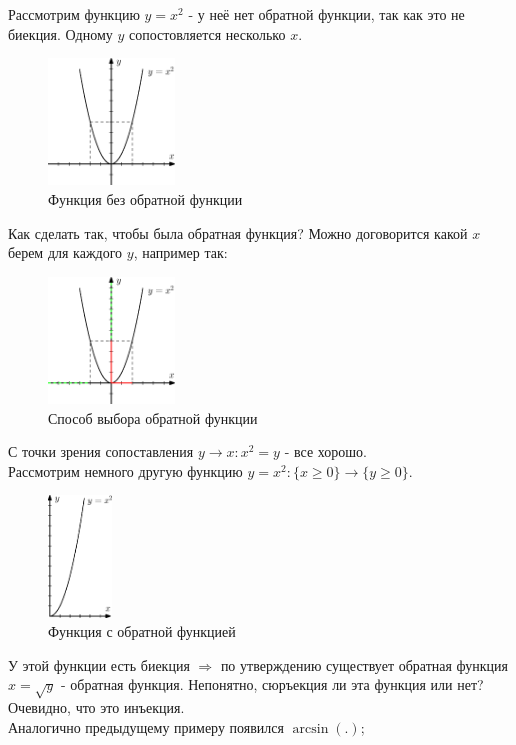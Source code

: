 \documentclass[12pt]{article}
\theoremstyle{definition}
\begin{document}
Рассмотрим функцию $y = x^2$ - у неё нет обратной функции, так как это не биекция. Одному $y$ сопостовляется несколько $x$.
\begin{figure}[H]
	\centering
	\includegraphics[width=0.3\textwidth]{4_5.eps}
	\caption{Функция без обратной функции}
	\label{4_5}
\end{figure}
Как сделать так, чтобы была обратная функция? Можно договорится какой $x$ берем для каждого $y$, например так:
\begin{figure}[H]
	\centering
	\includegraphics[width=0.3\textwidth]{4_6.eps}
	\caption{Способ выбора обратной функции}
	\label{4_6}
\end{figure}
С точки зрения сопоставления $y \rightarrow x \colon x^2 = y$ - все хорошо.\\
Рассмотрим немного другую функцию $y = x^2 \colon \{ x \geq 0 \} \rightarrow \{ y \geq 0 \}$.

\begin{figure}[H]
	\centering
	\includegraphics[width=0.15\textwidth]{4_7.eps}
	\caption{Функция с обратной функцией}
	\label{4_7}
\end{figure}
У этой функции есть биекция $\Rightarrow$ по утверждению существует обратная функция $x = \sqrt{y}$ - обратная функция. Непонятно, сюръекция ли эта функция или нет? Очевидно, что это инъекция.\\
Аналогично предыдущему примеру появился $\arcsin(.)$;
\end{document}
